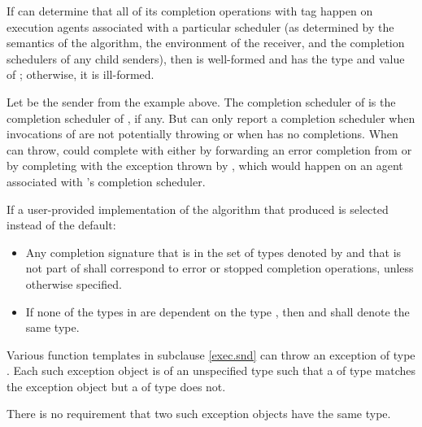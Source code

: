 \pnum
If  can determine that all of its completion operations
with tag  happen on execution agents
associated with a particular scheduler 
(as determined by the semantics of the algorithm,
the environment of the receiver, and
the completion schedulers of any child senders),
then 
is well-formed and has the type and value of ;
otherwise, it is ill-formed.
\begin{example}
Let  be the sender from the example above.
The  completion scheduler of  is
the  completion scheduler of , if any.
But  can only report a  completion scheduler
when invocations of  are not potentially throwing or
when  has no  completions.
When  can throw,
 could complete with  either
by forwarding an error completion from  or
by completing with the exception thrown by ,
which would happen on an agent associated with 's
 completion scheduler.
\end{example}

\pnum
If a user-provided implementation of the algorithm
that produced  is selected instead of the default:

\begin{itemize}
\item
Any completion signature
that is in the set of types
denoted by  and
that is not part of  shall correspond to
error or stopped completion operations,
unless otherwise specified.

\item
If none of the types in  are dependent on the type , then
 and
shall denote the same type.
\end{itemize}

\pnum
{}%
Various function templates in subclause \ref{exec.snd}
can throw an exception of type .
Each such exception object is of an unspecified type
such that a  of type 
matches the exception object
but a  of type  does not.
\begin{note}
There is no requirement that two such exception objects have the same type.
\end{note}

